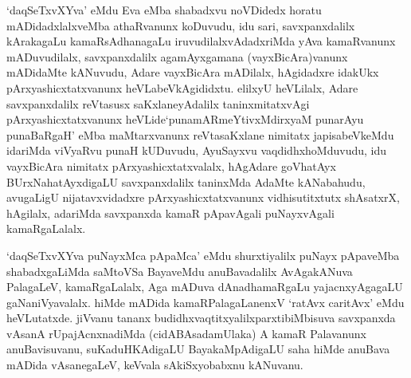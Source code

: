 \begin{artha}
`daqSeTxvXYva' eMdu Eva eMba shabadxvu noVDidedx horatu mADidadxlalxveMba athaRvanunx koDuvudu, idu sari, savxpanxdalilx kArakagaLu kamaRsAdhanagaLu iruvudilalxvAdadxriMda yAva kamaRvanunx mADuvudilalx, savxpanxdalilx agamAyxgamana (vayxBicAra)vanunx mADidaMte kANuvudu, Adare vayxBicAra mADilalx, hAgidadxre idakUkx pArxyashicxtatxvanunx heVLabeVkAgididxtu. elilxyU heVLilalx, Adare savxpanxdalilx reVtasusx saKxlaneyAdalilx taninxmitatxvAgi pArxyashicxtatxvanunx heVLide\break `punamARmeYtivxMdirxyaM punarAyu punaBaRgaH' eMba maMtarxvanunx reVtasaKxlane nimitatx japisabeVkeMdu idariMda viVyaRvu punaH kUDuvudu, AyuSayxvu vaqdidhxhoMduvudu, idu vayxBicAra nimitatx pArxyashicxtatxvalalx, hAgAdare goVhatAyx BUrxNahatAyxdigaLU savxpanxdalilx taninxMda AdaMte kANabahudu, avugaLigU nijatavxvidadxre pArxyashicxtatxvanunx vidhisutitxtutx shAsatxrX, hAgilalx, adariMda savxpanxda kamaR pApavAgali puNayxvAgali kamaRgaLalalx. 
\end{artha}

\begin{artha}
`daqSeTxvXYva puNayxMca pApaMca' eMdu shurxtiyalilx puNayx pApaveMba shabadxgaLiMda saMtoVSa BayaveMdu anuBavadalilx AvAgakANuva PalagaLeV, kamaRgaLalalx, Aga mADuva dAnadhamaRgaLu yajacnxyAgagaLU gaNaniVyavalalx. hiMde mADida kamaRPalagaLanenxV `ratAvx caritAvx' eMdu heVLutatxde. jiVvanu tananx budidhxvaqtitxyalilx\break parxtibiMbisuva savxpanxda vAsanA rUpajAcnxnadiMda (cidABAsada\break mUlaka) A kamaR Palavanunx anuBavisuvanu, suKaduHKAdigaLU BayakaMpAdigaLU saha hiMde anuBava mADida vAsanegaLeV, keVvala sAkiSxyobabxnu kANuvanu.
\end{artha}

